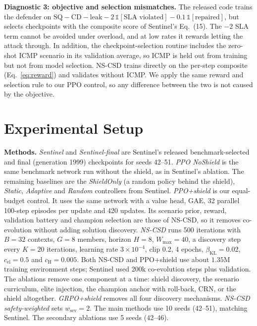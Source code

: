 \textbf{Diagnostic 3: objective and selection mismatches.} The released code
trains the defender on
$\mathrm{SQ}-\mathrm{CD}-\mathrm{leak}-2\,\mathbb{1}[\text{SLA violated}]-0.1\,\mathbb{1}[\text{repaired}]$,
but selects checkpoints with the composite score of Sentinel's Eq.~(15). The
$-2$ SLA term cannot be avoided under overload, and at low rates it rewards
letting the attack through. In addition, the checkpoint-selection routine
includes the zero-shot ICMP scenario in its validation average, so ICMP is
held out from training but not from model selection. NS-CSD trains directly on
the per-step composite (Eq.~\ref{eq:reward}) and validates without ICMP.
We apply the same reward and selection rule to our PPO control, so any
difference between the two is not caused by the objective.

\section{Experimental Setup}
\label{sec:setup}
\textbf{Methods.} \emph{Sentinel} and \emph{Sentinel-final} are Sentinel's
released benchmark-selected and final (generation 1999) checkpoints for seeds
42--51. \emph{PPO NoShield} is the same benchmark network run without the
shield, as in Sentinel's ablation. The remaining baselines are the
\emph{ShieldOnly} (a random policy behind the shield), \emph{Static},
\emph{Adaptive} and \emph{Random} controllers from Sentinel. \emph{PPO+shield}
is our equal-budget control. It uses the same network with a value head,
GAE, 32 parallel 100-step episodes per update and 420 updates. Its scenario
prior, reward, validation battery and champion selection are those of NS-CSD,
so it removes co-evolution without adding solution discovery.
\emph{NS-CSD} runs 500 iterations with $B{=}32$ contexts, $G{=}8$ members,
horizon $H{=}8$, $W_{\max}{=}40$, a discovery step every $K{=}20$ iterations,
learning rate $3\times10^{-4}$, clip 0.2, 4 epochs, $\beta_{\text{KL}}{=}0.02$,
$c_{\text{el}}{=}0.5$ and $c_{\text{H}}{=}0.005$. Both NS-CSD and PPO+shield use
about $1.35$M training environment steps; Sentinel used 200k co-evolution
steps plus validation. The ablations remove one component at a time: shield
discovery, the scenario curriculum, elite injection, the champion anchor with
roll-back, CRN, or the shield altogether. \emph{GRPO+shield} removes all four
discovery mechanisms. \emph{NS-CSD safety-weighted} sets $w_{\text{sev}}{=}2$.
The main methods use 10 seeds (42--51), matching Sentinel. The secondary
ablations use 5 seeds (42--46).

